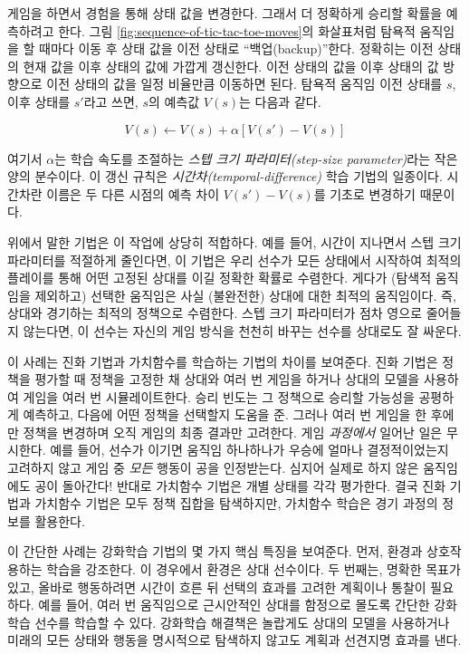 게임을 하면서 경험을 통해 상태 값을 변경한다. 그래서 더 정확하게 승리할 확률을
예측하려고 한다. 그림 \ref{fig:sequence-of-tic-tac-toe-moves}의 화살표처럼
탐욕적 움직임을 할 때마다 이동 후 상태 값을 이전 상태로 ``백업(backup)''한다.
정확히는 이전 상태의 현재 값을 이후 상태의 값에 가깝게 갱신한다. 이전 상태의
값을 이후 상태의 값 방향으로 이전 상태의 값을 일정 비율만큼 이동하면 된다.
탐욕적 움직임 이전 상태를 $s$, 이후 상태를 $s'$라고 쓰면, $s$의 예측값 $V(s)$는
다음과 같다.

\begin{equation*}
V(s) \leftarrow V(s) + \alpha[V(s')-V(s)]
\end{equation*}

여기서 $\alpha$는 학습 속도를 조절하는 \emph{스텝 크기 파라미터(step-size
parameter)}라는 작은 양의 분수이다. 이 갱신 규칙은
\emph{시간차(temporal-difference)} 학습 기법의 일종이다. 시간차란 이름은 두 다른
시점의 예측 차이 $V(s') - V(s)$를 기초로 변경하기 때문이다.

위에서 말한 기법은 이 작업에 상당히 적합하다. 예를 들어, 시간이 지나면서 스텝
크기 파라미터를 적절하게 줄인다면,
이 기법은 우리 선수가 모든 상태에서 시작하여 최적의 플레이를 통해 어떤 고정된
상대를 이길 정확한 확률로 수렴한다. 게다가 (탐색적 움직임을 제외하고) 선택한
움직임은 사실 (불완전한) 상대에 대한 최적의 움직임이다. 즉, 상대와 경기하는
최적의 정책으로 수렴한다. 스텝 크기 파라미터가 점차 영으로 줄어들지 않는다면,
이 선수는 자신의 게임 방식을 천천히 바꾸는 선수를 상대로도 잘 싸운다.


이 사례는 진화 기법과 가치함수를 학습하는 기법의 차이를 보여준다. 진화 기법은
정책을 평가할 때 정책을 고정한 채 상대와 여러 번 게임을 하거나 상대의 모델을
사용하여 게임을 여러 번 시뮬레이트한다. 승리 빈도는 그 정책으로 승리할 가능성을
공평하게 예측하고, 다음에 어떤 정책을 선택할지 도움을 준. 그러나 여러 번 게임을
한 후에만 정책을 변경하며 오직 게임의 최종 결과만 고려한다. 게임 \emph{과정에서}
일어난 일은 무시한다. 예를 들어, 선수가 이기면 움직임 하나하나가 우승에 얼마나
결정적이었는지 고려하지 않고 게임 중 \emph{모든} 행동이 공을 인정받는다. 심지어
실제로 하지 않은 움직임에도 공이 돌아간다! 반대로 가치함수 기법은 개별 상태를
각각 평가한다. 결국 진화 기법과 가치함수 기법은 모두 정책 집합을 탐색하지만,
가치함수 학습은 경기 과정의 정보를 활용한다.

이 간단한 사례는 강화학습 기법의 몇 가지 핵심 특징을 보여준다. 먼저, 환경과
상호작용하는 학습을 강조한다. 이 경우에서 환경은 상대 선수이다. 두 번째는,
명확한 목표가 있고, 올바로 행동하려면 시간이 흐른 뒤 선택의 효과를 고려한
계획이나 통찰이 필요하다. 예를 들어, 여러 번 움직임으로 근시안적인 상대를
함정으로 몰도록 간단한 강화학습 선수를 학습할 수 있다. 강화학습 해결책은
놀랍게도 상대의 모델을 사용하거나 미래의 모든 상태와 행동을 명시적으로 탐색하지
않고도 계획과 선견지명 효과를 낸다.

